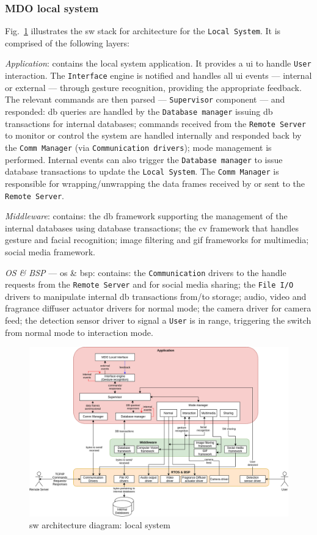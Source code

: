 \subsubsection{MDO local system}
\label{sec:mdo-local-system-1}
%
Fig.~\ref{fig:sw-arch-local} illustrates the \gls{sw} stack for architecture for
the \texttt{Local System}.
It is comprised of the following layers:
\begin{item-c}
\item \emph{Application}: contains the local system application. It provides a
  \gls{ui} to handle \texttt{User} interaction.  The \texttt{Interface} engine
  is notified and handles all \gls{ui} events --- internal or external ---
  through gesture recognition, providing the appropriate feedback. The relevant
  commands are then parsed --- \texttt{Supervisor} component --- and responded: \gls{db}
  queries are handled by the \texttt{Database manager} issuing \gls{db}
  transactions for internal databases;
  commands received from the \texttt{Remote Server} to monitor or control the
  system are handled internally
  and responded back by the \texttt{Comm Manager}  (via \texttt{Communication
    drivers}); mode management is performed.
  Internal events can also trigger the \texttt{Database manager} to issue
  database transactions to update the \texttt{Local System}.
  The \texttt{Comm Manager} is responsible for wrapping\slash unwrapping the data
  frames received by or sent to the \texttt{Remote Server}.
\item \emph{Middleware}: contains: the \gls{db} framework supporting the
  management of the internal databases using database transactions; the \gls{cv}
  framework that handles gesture and facial recognition; image filtering and
  \gls{gif} frameworks for multimedia; social media framework.
\item \emph{OS \& BSP} --- \gls{os} \& \gls{bsp}: contains: the \texttt{Communication}
  drivers to the handle requests from the \texttt{Remote Server} and for social
  media sharing; the
  \texttt{File I/O} drivers to manipulate internal \gls{db} transactions
  from\slash to storage; audio, video and fragrance diffuser actuator drivers
  for normal mode; the camera driver for camera feed; the detection sensor
  driver to signal a \texttt{User} is in range, triggering the switch from
  normal mode to interaction mode.
\end{item-c}
%
\begin{figure}[htb!]
\centering
    \includegraphics[width=1.0\columnwidth]{./img/sw-arch-local.png}
  \caption{\gls{sw} architecture diagram: local system}%
\label{fig:sw-arch-local}
\end{figure}
%
%
